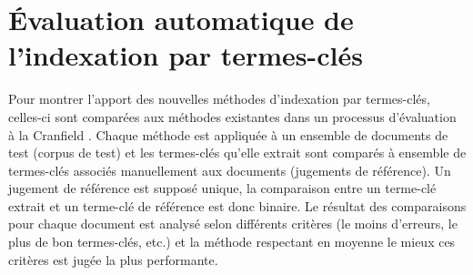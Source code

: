   \section{Évaluation automatique de l'indexation par termes-clés}
  \label{sec:main-state_of_the_art-automatic_evaluation_of_keyphrase_annotation}
    Pour montrer l'apport des nouvelles méthodes d'indexation par termes-clés,
    celles-ci sont comparées aux méthodes existantes dans un processus
    d'évaluation \og{}à la Cranfield\fg{} \citep{voorhees2002philosophy}. Chaque
    méthode est appliquée à un ensemble de documents de test (corpus de test) et
    les termes-clés qu'elle extrait sont comparés à ensemble de termes-clés
    associés manuellement aux documents (jugements de référence). Un jugement de
    référence est supposé unique, la comparaison entre un terme-clé extrait
    et un terme-clé de référence est donc binaire. Le résultat des comparaisons
    pour chaque document est analysé selon différents critères (le moins
    d'erreurs, le plus de bon termes-clés, etc.) et la méthode respectant en
    moyenne le mieux ces critères est jugée la plus performante.

